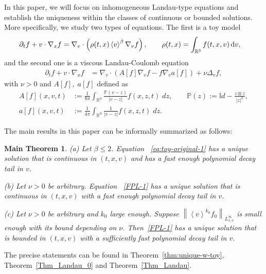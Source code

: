 \documentclass[11pt,american, reqno]{amsart}
\numberwithin{equation}{section}
\newtheorem*{thm}{Main Theorem}
\newcommand{\R}{\mathbb R}
\newcommand{\1}{\mathds{1}}
\newcommand{\Ni}{\noindent}
\newcommand{\del}{\partial}
\newcommand{\dv}{\, {\rm d} v}
\newcommand{\vpran}[1]{\left(#1\right)}
\newcommand{\nn}{\nonumber}
\newcommand{\norm}[1]{\left\lVert#1\right\rVert}
\newcommand{\vint}[1]{\left\langle#1\right\rangle}
\numberwithin{equation}{section}
\begin{document}
In this paper, we will focus on inhomogeneous Landau-type equations and establish the uniqueness within the classes of continuous or bounded solutions. More specifically, we study two types of equations. The first is a toy model 
\begin{align} \label{eq:toy-original-1}
 \del_t f + v \cdot \nabla_x f 
&= \nabla_v \cdot \vpran{\rho(t, x) \vint{v}^\beta \nabla_v f}, 
\qquad
  \rho(t, x) =  \int_{\R^3} f(t, x, v) \dv, 
\end{align}
and the second one is a viscous  Landau-Coulomb equation 
\begin{align}\label{FPL-1}
\partial_t f + v \cdot \nabla_x f &= \nabla_v \cdot \vpran{A[f] \nabla_v f - f \nabla_v a[f]} +\nu \Delta_v f,
\end{align}
with $\nu > 0$ and $A[f], \; a[f]$ defined as
\begin{align*}
A[f] (x,v,t)& := \frac{1}{8\pi} \int_{\mathbb{R}^3} \frac{\mathbb{P}(v-z) }{|v-z|} f(x,z,t)\;dz,
\qquad 
\mathbb{P}(z) := \mathbb{I}d - \frac{z \otimes z}{|z|^2},
\\
a[f] (x,v,t) &:= \frac{1}{4\pi} \int_{\mathbb{R}^3} \frac{1 }{|v-z|} f(x,z,t)\;dz.
\end{align*}

The main results in this paper can be informally summarized as follows:
\begin{thm}%

 \Ni (a) Let $\beta \leq 2$. Equation ~\eqref{eq:toy-original-1} has a unique solution that is continuous in $(t,x,v)$ and has a fast enough polynomial decay tail in $v$.  

\medskip

\Ni (b) Let $\nu > 0$ be arbitrary. Equation ~\eqref{FPL-1} has a unique solution that is continuous in $(t,x,v)$ with a fast enough polynomial decay tail in $v$.

\medskip
\Ni (c) Let $\nu > 0$ be arbitrary and $k_0$ large enough. Suppose $\norm{\vint{v}^{k_0} f_0}_{L^\infty_{x,v}}$ is small enough with its bound depending on $\nu$. Then~\eqref{FPL-1} has a unique solution that is bounded in $(t,x,v)$ with a sufficiently fast polynomial decay tail in $v$. 
\end{thm}

The precise statements can be found in Theorem~\ref{thm:unique-w-toy}, Theorem~\ref{Thm_Landau_0} and Theorem~\ref{Thm_Landau}. 
\end{document}
